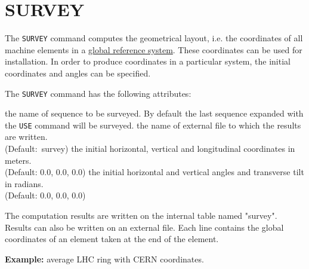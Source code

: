  
\chapter{SURVEY}
\label{chap:survey}

The \texttt{SURVEY} command computes the geometrical layout, i.e. the
coordinates of all machine elements in a 
\hyperref[sec:global_ref]{global reference system}. These
coordinates can be used for installation. In order to produce
coordinates in a particular system, the initial coordinates and angles
can be specified. 


The {\tt SURVEY} command has the following attributes:
\begin{madlist}
   the name of sequence to be surveyed. By default the
  last sequence expanded with the {\tt USE} command will be surveyed.  
    the name of external file to which the results are
  written.\\ (Default:~survey)
   the initial horizontal, vertical and longitudinal
  coordinates in meters.\\ (Default: 0.0, 0.0, 0.0) 
   the initial horizontal and vertical angles
  and transverse tilt in radians.\\ (Default: 0.0, 0.0, 0.0)
\end{madlist}

The computation results are written on the internal table named
"survey". Results can also be written on an external file. Each line
contains the global coordinates of an element taken at the end of the
element.

{\bf Example:} average LHC ring with CERN coordinates.


